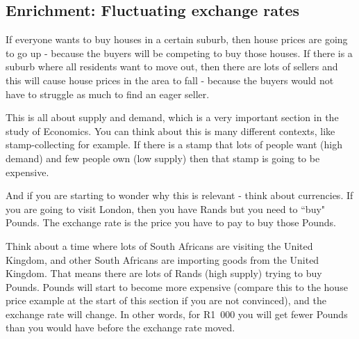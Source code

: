 \documentclass[10pt,a4paper,titlepage,twoside,openright]{report}
\begin{document}


\subsection{Enrichment:  Fluctuating exchange rates}
If everyone wants to buy houses in a certain suburb, then house prices are going to go up - because the buyers will be competing to buy those houses. If there is a suburb where all residents want to move out, then there are lots of sellers and this will cause house prices in the area to fall - because the buyers would not have to struggle as much to find an eager seller.

This is all about supply and demand, which is a very important section in the study of Economics. You can think about this is many different contexts, like stamp-collecting for example. If there is a stamp that lots of people want (high demand) and few people own (low supply) then that stamp is going to be expensive.

And if you are starting to wonder why this is relevant - think about currencies. If you are going to visit London, then you have Rands but you need to ``buy" Pounds. The exchange rate is the price you have to pay to buy those Pounds.

Think about a time where lots of South Africans are visiting the United Kingdom, and other South Africans are importing goods from the United Kingdom. That means there are lots of Rands (high supply) trying to buy Pounds. Pounds will start to become more expensive (compare this to the house price example at the start of this section if you are not convinced), and the exchange rate will change. In other words, for R1~000 you will get fewer Pounds than you would have before the exchange rate moved.
\end{document}
